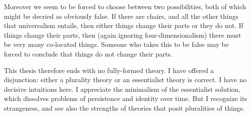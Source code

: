 \documentclass[12pt,twoside]{reedfancy}
\begin{document}
\begin{spacing}{1.25}
Moreover we seem to be forced to choose between two possibilities,
both of which might be decried as obviously false.  If there are
chairs, and all the other things that universalism entails, then
either things change their parts or they do not.  If things change
their parts, then (again ignoring four-dimensionalism) there must be
very many co-located things.  Someone who takes this to be false may
be forced to conclude that things do not change their parts.

This thesis therefore ends with no fully-formed theory.  I have
offered a disjunction: either a plurality theory or an essentialist
theory is correct. I have no decisive intuitions here.  I appreciate
the minimalism of the essentialist solution, which dissolves problems
of persistence and identity over time.  But I recognize its
strangeness, and see also the strengths of theories that posit
pluralities of things.

	
  \backmatter %

\newpage

\end{spacing}
\end{document}
